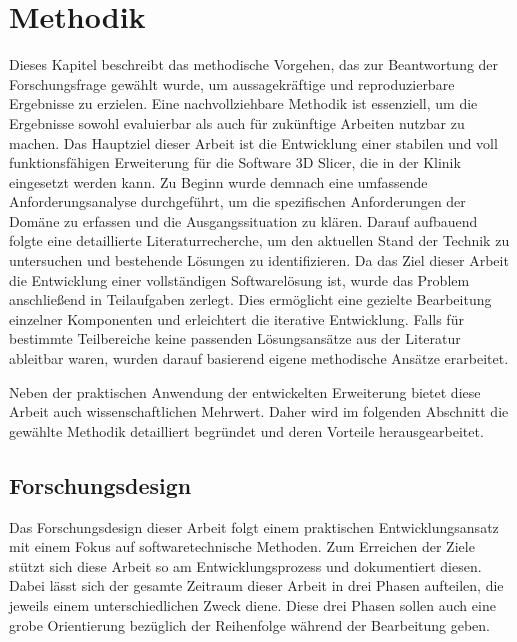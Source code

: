 \chapter{Methodik}
\label{chap:methodik} Dieses Kapitel beschreibt das methodische Vorgehen, das
zur Beantwortung der Forschungsfrage gewählt wurde, um aussagekräftige und reproduzierbare
Ergebnisse zu erzielen. Eine nachvollziehbare Methodik ist essenziell, um die Ergebnisse
sowohl evaluierbar als auch für zukünftige Arbeiten nutzbar zu machen. Das
Hauptziel dieser Arbeit ist die Entwicklung einer stabilen und voll
funktionsfähigen Erweiterung für die Software 3D Slicer, die in der Klinik eingesetzt
werden kann. Zu Beginn wurde demnach eine umfassende Anforderungsanalyse
durchgeführt, um die spezifischen Anforderungen der Domäne zu erfassen und die Ausgangssituation
zu klären. Darauf aufbauend folgte eine detaillierte Literaturrecherche, um den aktuellen
Stand der Technik zu untersuchen und bestehende Lösungen zu identifizieren. Da
das Ziel dieser Arbeit die Entwicklung einer vollständigen Softwarelösung ist, wurde
das Problem anschließend in Teilaufgaben zerlegt. Dies ermöglicht eine gezielte
Bearbeitung einzelner Komponenten und erleichtert die iterative Entwicklung. Falls
für bestimmte Teilbereiche keine passenden Lösungsansätze aus der Literatur ableitbar
waren, wurden darauf basierend eigene methodische Ansätze erarbeitet.

Neben der praktischen Anwendung der entwickelten Erweiterung bietet diese Arbeit
auch wissenschaftlichen Mehrwert. Daher wird im folgenden Abschnitt die gewählte
Methodik detailliert begründet und deren Vorteile herausgearbeitet.

\section{Forschungsdesign}
Das Forschungsdesign dieser Arbeit folgt einem praktischen Entwicklungsansatz mit
einem Fokus auf softwaretechnische Methoden. Zum Erreichen der Ziele stützt sich
diese Arbeit so am Entwicklungsprozess und dokumentiert diesen. Dabei lässt sich
der gesamte Zeitraum dieser Arbeit in drei Phasen aufteilen, die jeweils einem
unterschiedlichen Zweck diene. Diese drei Phasen sollen auch eine grobe Orientierung
bezüglich der Reihenfolge während der Bearbeitung geben.

\pagebreak

